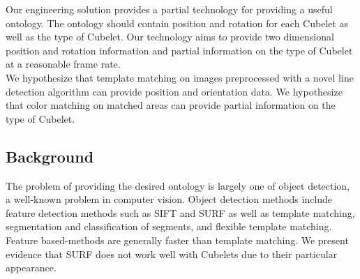 \documentclass[conference]{IEEEtran}
\begin{document}
Our engineering solution provides a partial technology for providing a useful ontology. The ontology should contain position and rotation for each Cubelet as well as the type of Cubelet. Our technology aims to provide two dimensional position and rotation information and partial information on the type of Cubelet at a reasonable frame rate.\\

We hypothesize that template matching on images preprocessed with a novel line detection algorithm can provide position and orientation data. We hypothesize that color matching on matched areas can provide partial information on the type of Cubelet.

\subsection{Background}
The problem of providing the desired ontology is largely one of object detection, a well-known problem in computer vision. Object detection methods include feature detection methods such as SIFT and SURF as well as template matching, segmentation and classification of segments, and flexible template matching. Feature based-methods are generally faster than template matching. We present evidence that SURF does not work well with Cubelets due to their particular appearance.

%
%

\end{document}
